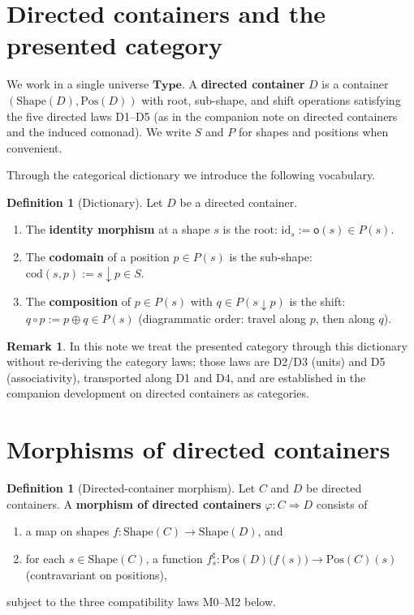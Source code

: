 \documentclass[11pt,a4paper]{article}
\theoremstyle{plain}
\theoremstyle{definition}
\newtheorem{definition}[theorem]{Definition}
\newtheorem{remark}[theorem]{Remark}
\newcommand{\Shape}{\mathrm{Shape}}
\newcommand{\Pos}{\mathrm{Pos}}
\newcommand{\Type}{\mathbf{Type}}
\newcommand{\id}{\mathrm{id}}
\newcommand{\rootpos}{\mathsf{o}}
\newcommand{\sub}{\mathbin{\downarrow}}
\newcommand{\shift}{\oplus}
\begin{document}
\section{Directed containers and the presented category}

We work in a single universe $\Type$. A \textbf{directed container} $D$ is a
container $(\Shape(D),\Pos(D))$ with root, sub-shape, and shift operations
satisfying the five directed laws D1--D5 (as in the companion note on directed
containers and the induced comonad). We write $S$ and $P$ for shapes and
positions when convenient.

Through the categorical dictionary we introduce the following vocabulary.

\begin{definition}[Dictionary]\label{def:dictionary}
Let $D$ be a directed container.
\begin{enumerate}
  \item The \textbf{identity morphism} at a shape $s$ is the root:
        $\id_s := \rootpos(s)\in P(s)$.
  \item The \textbf{codomain} of a position $p\in P(s)$ is the sub-shape:
        $\mathrm{cod}(s,p) := s\sub p\in S$.
  \item The \textbf{composition} of $p\in P(s)$ with
        $q\in P(s\sub p)$ is the shift:
        $q\circ p := p\shift q\in P(s)$
        (diagrammatic order: travel along $p$, then along $q$).
\end{enumerate}
\end{definition}

\begin{remark}
In this note we treat the presented category through this dictionary without
re-deriving the category laws; those laws are D2/D3 (units) and D5
(associativity), transported along D1 and D4, and are established in the
companion development on directed containers as categories.
\end{remark}

\section{Morphisms of directed containers}

\begin{definition}[Directed-container morphism]\label{def:dcont-morph}
Let $C$ and $D$ be directed containers. A \textbf{morphism of directed
containers} $\varphi:C\Rightarrow D$ consists of
\begin{enumerate}
  \item a map on shapes $f:\Shape(C)\to\Shape(D)$, and
  \item for each $s\in\Shape(C)$, a function
        $f^\sharp_s:\Pos(D)\bigl(f(s)\bigr)\to\Pos(C)(s)$
        (contravariant on positions),
\end{enumerate}
subject to the three compatibility laws M0--M2 below.
\end{definition}
\end{document}

